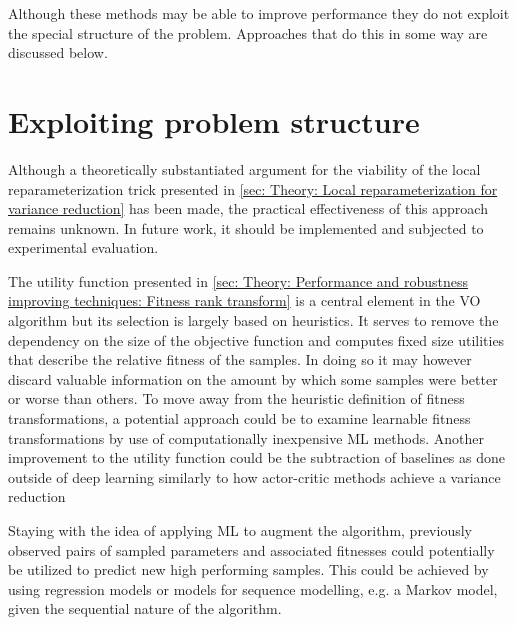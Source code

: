 Although these methods may be able to improve performance they do not exploit the special structure of the problem. Approaches that do this in some way are discussed below.

\section{Exploiting problem structure}
Although a theoretically substantiated argument for the viability of the local reparameterization trick presented in \autoref{sec: Theory: Local reparameterization for variance reduction} has been made, the practical effectiveness of this approach remains unknown. In future work, it should be implemented and subjected to experimental evaluation. 

The utility function presented in \autoref{sec: Theory: Performance and robustness improving techniques: Fitness rank transform} is a central element in the \gls{VO} algorithm but its selection is largely based on heuristics. 
It serves to remove the dependency on the size of the objective function and computes fixed size utilities that describe the relative fitness of the samples. In doing so it may however discard valuable information on the amount by which some samples were better or worse than others. 
To move away from the heuristic definition of fitness transformations, a potential approach could be to examine learnable fitness transformations by use of computationally inexpensive \gls{ML} methods. Another improvement to the utility function could be the subtraction of baselines as done outside of deep learning \cite{Yi2009} similarly to how actor-critic methods achieve a variance reduction \cite{}

Staying with the idea of applying \gls{ML} to augment the algorithm, previously observed pairs of sampled parameters and associated fitnesses could potentially be utilized to predict new high performing samples. This could be achieved by using regression models or models for sequence modelling, e.g. a Markov model, given the sequential nature of the algorithm.
